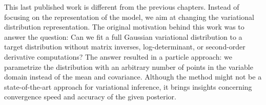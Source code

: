 


\graphicspath{{7/figures/}}
This last published work is different from the previous chapters.
Instead of focusing on the representation of the model, we aim at changing the variational distribution representation.
The original motivation behind this work was to answer the question: 
Can we fit a full Gaussian variational distribution to a target distribution without matrix inverses, log-determinant, or second-order derivative computations?
The answer resulted in a particle approach: we parametrize the distribution with an arbitrary number of points in the variable domain instead of the mean and covariance.
Although the method might not be a state-of-the-art approach for variational inference, it brings insights concerning convergence speed and accuracy of the given posterior.

